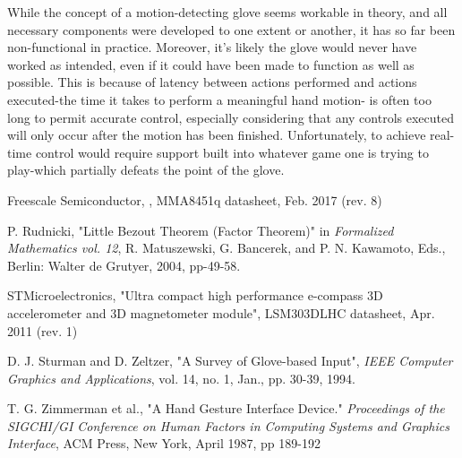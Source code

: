 \documentclass{article}
\begin{document}
	While the concept of a motion-detecting glove seems workable in theory, and all necessary components were developed to one extent or another, it has so far been non-functional in practice. Moreover, it's likely the glove would never have worked as intended, even if it could have been made to function as well as possible. This is because of latency between actions performed and actions executed-the time it takes to perform a meaningful hand motion- is often too long to permit accurate control, especially considering that any controls executed will only occur after the motion has been finished. Unfortunately, to achieve real-time control would require support built into whatever game one is trying to play-which partially defeats the point of the glove. \newpage
	
	\begin{thebibliography}{9}
		Freescale Semiconductor, , MMA8451q datasheet, Feb. 2017 (rev. 8)
		
		P. Rudnicki, "Little Bezout Theorem (Factor Theorem)" in 
		\textit{Formalized Mathematics vol. 12},
		R. Matuszewski, G. Bancerek, and P. N. Kawamoto, Eds., 
		Berlin: Walter de Grutyer, 2004, pp-49-58.
		
		STMicroelectronics, "Ultra compact high performance e-compass 3D accelerometer and 3D magnetometer module", LSM303DLHC datasheet, Apr. 2011 (rev. 1)
		
		D. J. Sturman and D. Zeltzer, "A Survey of Glove-based Input", 
		\textit{IEEE Computer Graphics and Applications}, vol. 14, no. 1, Jan., pp. 30-39, 1994.
		
		T. G. Zimmerman et al., "A Hand Gesture Interface Device."
		\textit{Proceedings of the SIGCHI/GI Conference on Human Factors in Computing Systems and Graphics Interface}, ACM Press, New York, April 1987, pp 189-192
	\end{thebibliography}
\end{document}

